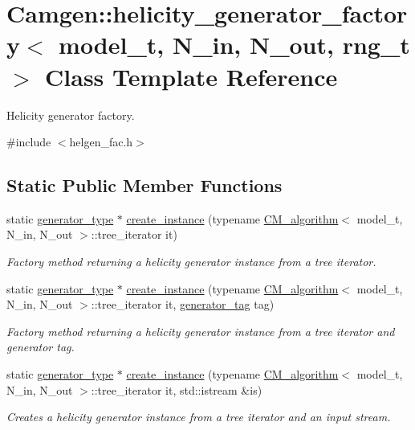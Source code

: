 \hypertarget{a00269}{\section{Camgen\-:\-:helicity\-\_\-generator\-\_\-factory$<$ model\-\_\-t, N\-\_\-in, N\-\_\-out, rng\-\_\-t $>$ Class Template Reference}
\label{a00269}
}


Helicity generator factory.  




{\ttfamily \#include $<$helgen\-\_\-fac.\-h$>$}

\subsection*{Static Public Member Functions}
\begin{DoxyCompactItemize}
\item 
static \hyperlink{a00266}{generator\-\_\-type} $\ast$ \hyperlink{a00269_a8b32dfacd90b307ceb08a29046ffa526}{create\-\_\-instance} (typename \hyperlink{a00070}{C\-M\-\_\-algorithm}$<$ model\-\_\-t, N\-\_\-in, N\-\_\-out $>$\-::tree\-\_\-iterator it)
\begin{DoxyCompactList}\small\item\em Factory method returning a helicity generator instance from a tree iterator. \end{DoxyCompactList}\item 
static \hyperlink{a00266}{generator\-\_\-type} $\ast$ \hyperlink{a00269_a76fb9c8e4b194310bc3f8a0f113dc662}{create\-\_\-instance} (typename \hyperlink{a00070}{C\-M\-\_\-algorithm}$<$ model\-\_\-t, N\-\_\-in, N\-\_\-out $>$\-::tree\-\_\-iterator it, \hyperlink{a00270_a8481232150a01996d5ca4035ea902c31}{generator\-\_\-tag} tag)
\begin{DoxyCompactList}\small\item\em Factory method returning a helicity generator instance from a tree iterator and generator tag. \end{DoxyCompactList}\item 
static \hyperlink{a00266}{generator\-\_\-type} $\ast$ \hyperlink{a00269_af98f0e48ff9aed1dde40a3358a63b974}{create\-\_\-instance} (typename \hyperlink{a00070}{C\-M\-\_\-algorithm}$<$ model\-\_\-t, N\-\_\-in, N\-\_\-out $>$\-::tree\-\_\-iterator it, std\-::istream \&is)
\begin{DoxyCompactList}\small\item\em Creates a helicity generator instance from a tree iterator and an input stream. \end{DoxyCompactList}\end{DoxyCompactItemize}


